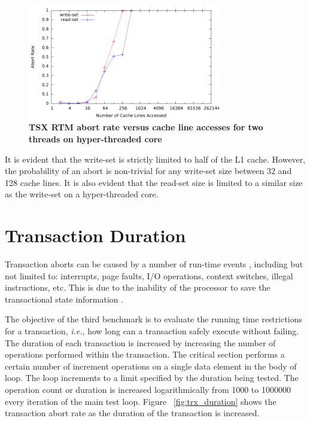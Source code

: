\documentclass[11pt]{book}
\begin{document}
\begin{figure}[H]
    \centering
    \graphicspath{ {./figures/} }
    \includegraphics[width=0.75\textwidth,keepaspectratio]{trxSize_hyperthreaded}
    \caption{\textbf{TSX RTM abort rate versus cache line accesses for two 
    threads on hyper-threaded core}}
    \label{fig:trx_size_ht}
\end{figure}

It is evident that the write-set is strictly limited to half of the L1 cache.  However,
the probability of an abort is non-trivial for any write-set size between 32 and 128 cache
lines.  It is also evident that the read-set size is limited to a similar size as the
write-set on a hyper-threaded core.

\section{Transaction Duration}

Transaction aborts can be caused by a number of run-time events \cite{intel_prog_ref},
including but not limited to: interrupts, page faults, I/O operations, context switches,
illegal instructions, etc.  This is due to the inability of the processor to save the
transactional state information \cite{schwahn}.

The objective of the third benchmark is to evaluate the running time
restrictions for a transaction, \emph{i.e.}, how long can a transaction safely
execute without failing.  The duration of each transaction is increased by
increasing the number of operations performed within the transaction. The
critical section performs a certain number of increment operations on a single
data element in the body of loop.  The loop increments to a limit specified by
the duration being tested.  The operation count or duration is increased
logarithmically from 1000 to 1000000 every iteration of the main test loop.
Figure ~\ref{fig:trx_duration} shows the transaction abort rate as the duration
of the transaction is increased.
\end{document}
